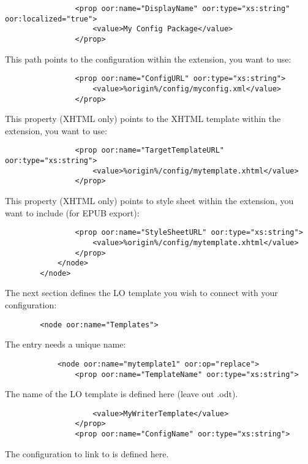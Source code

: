 \documentclass{article}
\begin{document}
\begin{verbatim}
                <prop oor:name="DisplayName" oor:type="xs:string" oor:localized="true">
                    <value>My Config Package</value>
                </prop>
\end{verbatim}
{\mdseries
This path points to the configuration within the extension, you want to use:}

\begin{verbatim}
                <prop oor:name="ConfigURL" oor:type="xs:string">
                    <value>%origin%/config/myconfig.xml</value>
                </prop>
\end{verbatim}
{\mdseries
This property (XHTML only) points to the XHTML template within the extension, you want to use:}

\begin{verbatim}
                <prop oor:name="TargetTemplateURL" oor:type="xs:string">
                    <value>%origin%/config/mytemplate.xhtml</value>
                </prop>
\end{verbatim}
{\mdseries
This property (XHTML only) points to style sheet within the extension, you want to include (for EPUB export):}

\begin{verbatim}
                <prop oor:name="StyleSheetURL" oor:type="xs:string">
                    <value>%origin%/config/mytemplate.xhtml</value>
                </prop>
            </node>
        </node>
\end{verbatim}
{\mdseries
The next section defines the LO template you wish to connect with your configuration:}

\begin{verbatim}
        <node oor:name="Templates">
\end{verbatim}
{\mdseries
The entry needs a unique name:}

\begin{verbatim}
            <node oor:name="mytemplate1" oor:op="replace">
                <prop oor:name="TemplateName" oor:type="xs:string">
\end{verbatim}
{\mdseries
The name of the LO template is defined here (leave out .odt).}

\begin{verbatim}
                    <value>MyWriterTemplate</value>
                </prop>
                <prop oor:name="ConfigName" oor:type="xs:string">
\end{verbatim}
{\mdseries
The configuration to link to is defined here.}
\end{document}
